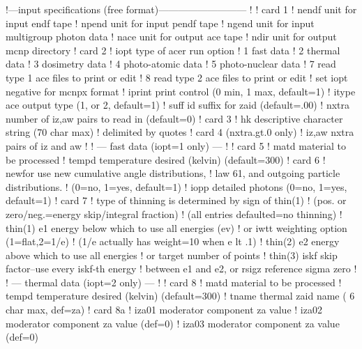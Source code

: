 \small
\begin{ccode}

   !---input specifications (free format)---------------------------
   !
   ! card 1
   !    nendf    unit for input endf tape
   !    npend    unit for input pendf tape
   !    ngend    unit for input multigroup photon data
   !    nace     unit for output ace tape
   !    ndir     unit for output mcnp directory
   ! card 2
   !    iopt     type of acer run option
   !               1   fast data
   !               2   thermal data
   !               3   dosimetry data
   !               4   photo-atomic data
   !               5   photo-nuclear data
   !               7   read type 1 ace files to print or edit
   !               8   read type 2 ace files to print or edit
   !                set iopt negative for mcnpx format
   !    iprint   print control (0 min, 1 max, default=1)
   !    itype    ace output type (1, or 2, default=1)
   !    suff     id suffix for zaid (default=.00)
   !    nxtra    number of iz,aw pairs to read in (default=0)
   ! card 3
   !    hk       descriptive character string (70 char max)
   !             delimited by quotes
   ! card 4 (nxtra.gt.0 only)
   !    iz,aw    nxtra pairs of iz and aw
   !
   !    --- fast data (iopt=1 only) ---
   !
   ! card 5
   !    matd     material to be processed
   !    tempd    temperature desired (kelvin) (default=300)
   ! card 6
   !    newfor   use new cumulative angle distributions,
   !               law 61, and outgoing particle distributions.
   !               (0=no, 1=yes, default=1)
   !    iopp     detailed photons (0=no, 1=yes, default=1)
   ! card 7
   !  type of thinning is determined by sign of thin(1)
   !  (pos. or zero/neg.=energy skip/integral fraction)
   !  (all entries defaulted=no thinning)
   !    thin(1)  e1 energy below which to use all energies (ev)
   !             or iwtt weighting option (1=flat,2=1/e)
   !             (1/e actually has weight=10 when e lt .1)
   !    thin(2)  e2 energy above which to use all energies
   !             or target number of points
   !    thin(3)  iskf skip factor--use every iskf-th energy
   !             between e1 and e2, or rsigz reference sigma zero
   !
   !   --- thermal data (iopt=2 only) ---
   !
   ! card 8
   !    matd     material to be processed
   !    tempd    temperature desired (kelvin) (default=300)
   !    tname    thermal zaid name ( 6 char max, def=za)
   ! card 8a
   !    iza01    moderator component za value
   !    iza02    moderator component za value (def=0)
   !    iza03    moderator component za value (def=0)

\end{ccode}
